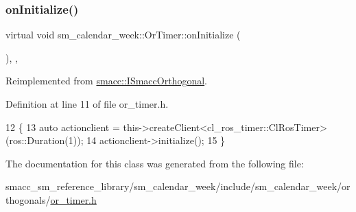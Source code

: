 \subsubsection{\texorpdfstring{on\+Initialize()}{onInitialize()}}
{\footnotesize\ttfamily virtual void sm\+\_\+calendar\+\_\+week\+::\+Or\+Timer\+::on\+Initialize (\begin{DoxyParamCaption}{ }\end{DoxyParamCaption})\hspace{0.3cm}{\ttfamily [inline]}, {\ttfamily [override]}, {\ttfamily [virtual]}}



Reimplemented from \hyperlink{classsmacc_1_1ISmaccOrthogonal_a6bb31c620cb64dd7b8417f8705c79c7a}{smacc\+::\+I\+Smacc\+Orthogonal}.



Definition at line 11 of file or\+\_\+timer.\+h.


\begin{DoxyCode}
12     \{
13         \textcolor{keyword}{auto} actionclient = this->createClient<cl\_ros\_timer::ClRosTimer>(ros::Duration(1));
14         actionclient->initialize();
15     \}
\end{DoxyCode}


The documentation for this class was generated from the following file\+:\begin{DoxyCompactItemize}
\item 
smacc\+\_\+sm\+\_\+reference\+\_\+library/sm\+\_\+calendar\+\_\+week/include/sm\+\_\+calendar\+\_\+week/orthogonals/\hyperlink{sm__calendar__week_2include_2sm__calendar__week_2orthogonals_2or__timer_8h}{or\+\_\+timer.\+h}\end{DoxyCompactItemize}
